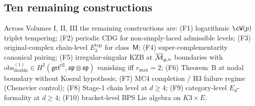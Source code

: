 \subsection{Ten remaining constructions}
\label{subsec:v3-intro-open-frontiers}

Across Volumes I, II, III the remaining constructions are:
(F1) logarithmic $\cW(p)$ triplet tempering;
(F2) periodic CDG for non-simply-laced admissible levels;
(F3) original-complex chain-level $E_3^{\mathrm{top}}$ for class~$\mathsf M$;
(F4) super-complementarity canonical pairing;
(F5) irregular-singular KZB at $\overline{\mathcal{M}}_{g,n}$ boundaries with
$\mathrm{obs}^{(1)}_{\mathrm{double}}\in H^2(\mathfrak{grt}^{\mathrm{ell}},\mathfrak{sp}\otimes\mathfrak{sp})$
vanishing iff $r_{\max}=2$;
(F6) Theorem~B at nodal boundary without Koszul hypothesis;
(F7) MC4 completion / H3 failure regime (Chenevier control);
(F8) Stage-1 chain level at $d\ge 4$;
(F9) category-level $E_d$-formality at $d\ge 4$;
(F10) bracket-level BPS Lie algebra on $K3\times E$.
